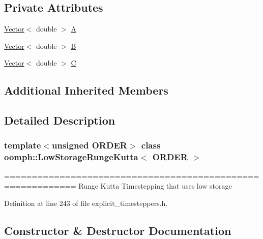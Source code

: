 \subsection*{Private Attributes}
\begin{DoxyCompactItemize}
\item 
\hyperlink{classoomph_1_1Vector}{Vector}$<$ double $>$ \hyperlink{classoomph_1_1LowStorageRungeKutta_a80a97c2c9660cefbe4d7cf515f768386}{A}
\item 
\hyperlink{classoomph_1_1Vector}{Vector}$<$ double $>$ \hyperlink{classoomph_1_1LowStorageRungeKutta_aaeae08c5f78c154a467d8e0a7fc7572b}{B}
\item 
\hyperlink{classoomph_1_1Vector}{Vector}$<$ double $>$ \hyperlink{classoomph_1_1LowStorageRungeKutta_a204b3addc6e35d2870336ff1bee7ace0}{C}
\end{DoxyCompactItemize}
\subsection*{Additional Inherited Members}


\subsection{Detailed Description}
\subsubsection*{template$<$unsigned O\+R\+D\+ER$>$\newline
class oomph\+::\+Low\+Storage\+Runge\+Kutta$<$ O\+R\+D\+E\+R $>$}

=========================================================== Runge Kutta Timestepping that uses low storage 

Definition at line 243 of file explicit\+\_\+timesteppers.\+h.



\subsection{Constructor \& Destructor Documentation}
\mbox{\label{classoomph_1_1LowStorageRungeKutta_a93db8747a10fc7361e8034083255428a}} 
